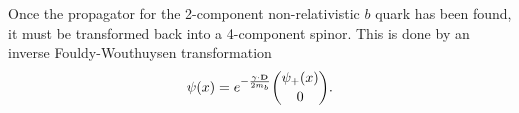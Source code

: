     Once the propagator for the 2-component non-relativistic $b$ quark has been found, it must be transformed back into a 4-component spinor. This is done by an inverse Fouldy-Wouthuysen transformation \cite{PhysRev.78.29}
    \begin{align}
      \psi(x) = e^{-{{\bf{\gamma}}\cdot{\bf{D}}\over 2m_b}}\binom{\psi_+(x)}{0}.
      \label{eq:FoldyWoldy}
      \end{align}
